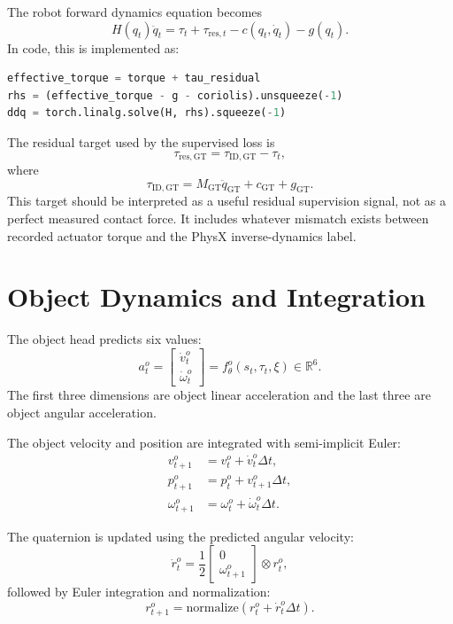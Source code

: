 \documentclass[11pt]{article}
\begin{document}
The robot forward dynamics equation becomes
\begin{equation}
  H(q_t)\ddot{q}_t
  =
  \tau_t
  +
  \tau_{\mathrm{res},t}
  -
  c(q_t,\dot{q}_t)
  -
  g(q_t).
\end{equation}
In code, this is implemented as:
\begin{lstlisting}[language=Python]
effective_torque = torque + tau_residual
rhs = (effective_torque - g - coriolis).unsqueeze(-1)
ddq = torch.linalg.solve(H, rhs).squeeze(-1)
\end{lstlisting}

The residual target used by the supervised loss is
\begin{equation}
  \tau_{\mathrm{res,GT}}
  =
  \tau_{\mathrm{ID,GT}}
  -
  \tau_t,
\end{equation}
where
\begin{equation}
  \tau_{\mathrm{ID,GT}}
  =
  M_{\mathrm{GT}}\ddot{q}_{\mathrm{GT}}
  +
  c_{\mathrm{GT}}
  +
  g_{\mathrm{GT}}.
\end{equation}
This target should be interpreted as a useful residual supervision signal, not
as a perfect measured contact force. It includes whatever mismatch exists
between recorded actuator torque and the PhysX inverse-dynamics label.

\section{Object Dynamics and Integration}

The object head predicts six values:
\begin{equation}
  a^o_t =
  \begin{bmatrix}
    \dot{v}^o_t \\
    \dot{\omega}^o_t
  \end{bmatrix}
  =
  f_{\theta}^{o}(s_t,\tau_t,\xi)
  \in \mathbb{R}^{6}.
\end{equation}
The first three dimensions are object linear acceleration and the last three are
object angular acceleration.

The object velocity and position are integrated with semi-implicit Euler:
\begin{align}
  v^o_{t+1} &= v^o_t + \dot{v}^o_t \Delta t, \\
  p^o_{t+1} &= p^o_t + v^o_{t+1}\Delta t, \\
  \omega^o_{t+1} &= \omega^o_t + \dot{\omega}^o_t \Delta t.
\end{align}

The quaternion is updated using the predicted angular velocity:
\begin{equation}
  \dot{r}^o_t
  =
  \frac{1}{2}
  \begin{bmatrix}
    0 \\
    \omega^o_{t+1}
  \end{bmatrix}
  \otimes
  r^o_t,
\end{equation}
followed by Euler integration and normalization:
\begin{equation}
  r^o_{t+1}
  =
  \mathrm{normalize}
  \left(
    r^o_t + \dot{r}^o_t \Delta t
  \right).
\end{equation}
\end{document}
